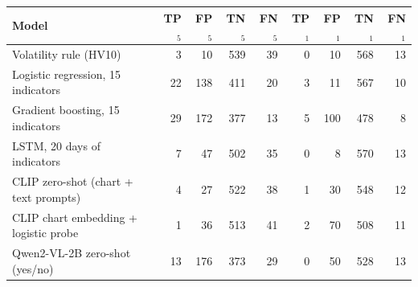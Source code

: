 \begin{tabular}{lrrrrrrrr}
\toprule
Model & TP$_{5}$ & FP$_{5}$ & TN$_{5}$ & FN$_{5}$ & TP$_{1}$ & FP$_{1}$ & TN$_{1}$ & FN$_{1}$ \\
\midrule
Volatility rule (HV10) & 3 & 10 & 539 & 39 & 0 & 10 & 568 & 13 \\
Logistic regression, 15 indicators & 22 & 138 & 411 & 20 & 3 & 11 & 567 & 10 \\
Gradient boosting, 15 indicators & 29 & 172 & 377 & 13 & 5 & 100 & 478 & 8 \\
LSTM, 20 days of indicators & 7 & 47 & 502 & 35 & 0 & 8 & 570 & 13 \\
CLIP zero-shot (chart + text prompts) & 4 & 27 & 522 & 38 & 1 & 30 & 548 & 12 \\
CLIP chart embedding + logistic probe & 1 & 36 & 513 & 41 & 2 & 70 & 508 & 11 \\
Qwen2-VL-2B zero-shot (yes/no) & 13 & 176 & 373 & 29 & 0 & 50 & 528 & 13 \\
\bottomrule
\end{tabular}
